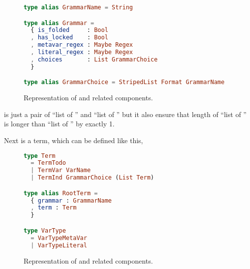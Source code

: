 \documentclass[master.tex]{subfiles}
\begin{document}
\begin{figure}[H]
\begin{framed}
\begin{lstlisting}[language=elm]
type alias GrammarName = String

type alias Grammar =
  { is_folded     : Bool
  , has_locked    : Bool
  , metavar_regex : Maybe Regex
  , literal_regex : Maybe Regex
  , choices       : List GrammarChoice
  }

type alias GrammarChoice = StripedList Format GrammarName
\end{lstlisting}
\end{framed}
\caption{Representation of  and related components.}
\label{fig:implementation-repo-grammar}
\end{figure}

 is just a pair of ``list of
'' and ``list of '' but it also ensure that
length of ``list of '' is longer than ``list of
'' by exactly 1.

Next is a term, which can be defined like this,

\begin{figure}[H]
\begin{framed}
\begin{lstlisting}[language=elm]
type Term
  = TermTodo
  | TermVar VarName
  | TermInd GrammarChoice (List Term)

type alias RootTerm =
  { grammar : GrammarName
  , term : Term
  }

type VarType
  = VarTypeMetaVar
  | VarTypeLiteral
\end{lstlisting}
\end{framed}
\caption{Representation of  and related components.}
\label{fig:implementation-repo-term}
\end{figure}
\end{document}
